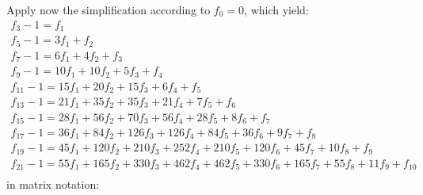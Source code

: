 \documentclass[a4paper,dottedtoc,headinclude,footinclude]{report} %
\theoremstyle{plain}
\begin{document}
        
    Apply now the simplification according to $f_{0}=0$, which yield:
    \begin{displaymath}
        \begin{array}{c}f_{3} - 1 = f_{1}\\
        f_{5} - 1 = 3 f_{1} + f_{2}\\
        f_{7} - 1 = 6 f_{1} + 4 f_{2} + f_{3}\\
        f_{9} - 1 = 10 f_{1} + 10 f_{2} + 5 f_{3} + f_{4}\\
        f_{11} - 1 = 15 f_{1} + 20 f_{2} + 15 f_{3} + 6 f_{4} + f_{5}\\
        f_{13} - 1 = 21 f_{1} + 35 f_{2} + 35 f_{3} + 21 f_{4} + 7 f_{5} + f_{6}\\
        f_{15} - 1 = 28 f_{1} + 56 f_{2} + 70 f_{3} + 56 f_{4} + 28 f_{5} + 8 f_{6} + f_{7}\\
        f_{17} - 1 = 36 f_{1} + 84 f_{2} + 126 f_{3} + 126 f_{4} + 84 f_{5} + 36 f_{6} + 9 f_{7} + f_{8}\\
        f_{19} - 1 = 45 f_{1} + 120 f_{2} + 210 f_{3} + 252 f_{4} + 210 f_{5} + 120 f_{6} + 45 f_{7} + 10 f_{8} + f_{9}\\
        f_{21} - 1 = 55 f_{1} + 165 f_{2} + 330 f_{3} + 462 f_{4} + 462 f_{5} + 330 f_{6} + 165 f_{7} + 55 f_{8} + 11 f_{9} + f_{10}\\
        \end{array}
    \end{displaymath}
    in matrix notation:
\end{document}
